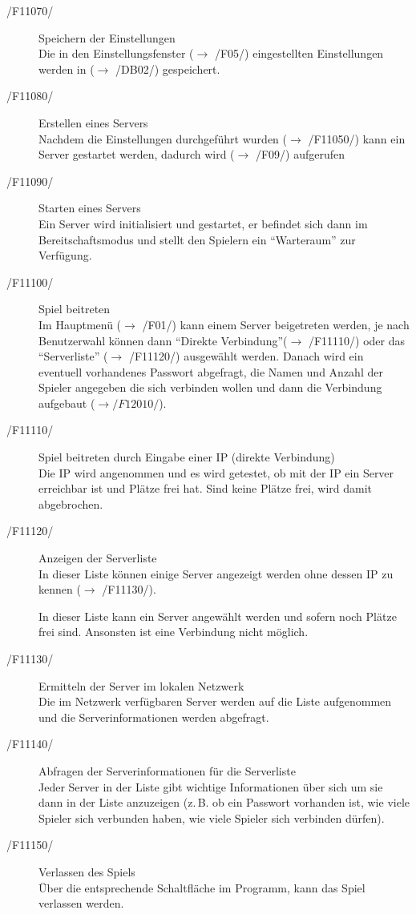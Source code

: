 \documentclass[a4paper,10pt]{article}
\begin{document}
\begin{description}
\item[/F11070/] Speichern der Einstellungen \\
Die in den Einstellungsfenster ($\rightarrow$ /F05/) eingestellten Einstellungen werden in ($\rightarrow$ /DB02/) gespeichert.

\item[/F11080/] Erstellen eines Servers \\
Nachdem die Einstellungen durchgeführt wurden ($\rightarrow$ /F11050/) kann ein Server gestartet werden, dadurch wird ($\rightarrow$ /F09/) aufgerufen

\item[/F11090/] Starten eines Servers \\
Ein Server wird initialisiert und gestartet, er befindet sich dann im Bereitschaftsmodus und stellt den Spielern ein "`Warteraum"' zur Verfügung.

\item[/F11100/] Spiel beitreten \\
Im Hauptmenü ($\rightarrow$ /F01/) kann einem Server beigetreten werden, je nach Benutzerwahl können dann "`Direkte Verbindung"'($\rightarrow$ /F11110/) oder das "`Serverliste"' ($\rightarrow$ /F11120/) ausgewählt werden. Danach wird ein eventuell vorhandenes Passwort abgefragt, die Namen und Anzahl der Spieler angegeben die sich verbinden wollen und dann die Verbindung aufgebaut ($\rightarrow /F12010/$). 

\item[/F11110/] Spiel beitreten durch Eingabe einer IP (direkte Verbindung) \\
Die IP wird angenommen und es wird getestet, ob mit der IP ein Server erreichbar ist und Plätze frei hat. Sind keine Plätze frei, wird damit abgebrochen.

\item[/F11120/] Anzeigen der Serverliste \\
In dieser Liste können einige Server angezeigt werden ohne dessen IP zu kennen ($\rightarrow$ /F11130/).

In dieser Liste kann ein Server angewählt werden und sofern noch Plätze frei sind. Ansonsten ist eine Verbindung nicht möglich.
\item[/F11130/] Ermitteln der Server im lokalen Netzwerk \\
Die im Netzwerk verfügbaren Server werden auf die Liste aufgenommen und die Serverinformationen werden abgefragt.
\item[/F11140/] Abfragen der Serverinformationen für die Serverliste \\
Jeder Server in der Liste gibt wichtige Informationen über sich um sie dann in der Liste anzuzeigen (z.\,B. ob ein Passwort vorhanden ist, wie viele Spieler sich verbunden haben, wie viele Spieler sich verbinden dürfen).
\item[/F11150/] Verlassen des Spiels \\
Über die entsprechende Schaltfläche im Programm, kann das Spiel verlassen werden.
\end{description}
\end{document}
